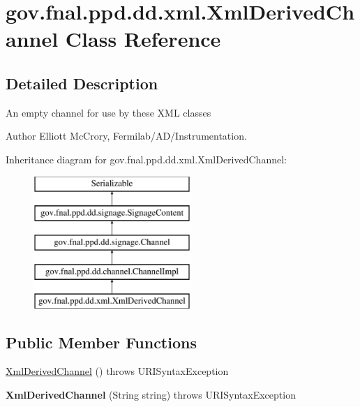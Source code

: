 \hypertarget{classgov_1_1fnal_1_1ppd_1_1dd_1_1xml_1_1XmlDerivedChannel}{\section{gov.\-fnal.\-ppd.\-dd.\-xml.\-Xml\-Derived\-Channel Class Reference}
\label{classgov_1_1fnal_1_1ppd_1_1dd_1_1xml_1_1XmlDerivedChannel}
}


\subsection{Detailed Description}
An empty channel for use by these X\-M\-L classes

\begin{DoxyAuthor}{Author}
Elliott Mc\-Crory, Fermilab/\-A\-D/\-Instrumentation. 
\end{DoxyAuthor}
Inheritance diagram for gov.\-fnal.\-ppd.\-dd.\-xml.\-Xml\-Derived\-Channel\-:\begin{figure}[H]
\begin{center}
\leavevmode
\includegraphics[height=5.000000cm]{classgov_1_1fnal_1_1ppd_1_1dd_1_1xml_1_1XmlDerivedChannel}
\end{center}
\end{figure}
\subsection*{Public Member Functions}
\begin{DoxyCompactItemize}
\item 
\hyperlink{classgov_1_1fnal_1_1ppd_1_1dd_1_1xml_1_1XmlDerivedChannel_a99604d4e33cb14128bdadbbeb26e961a}{Xml\-Derived\-Channel} ()  throws U\-R\-I\-Syntax\-Exception 
\item 
\hypertarget{classgov_1_1fnal_1_1ppd_1_1dd_1_1xml_1_1XmlDerivedChannel_a42743783587a2fcfe7ed1eebe5d04299}{{\bfseries Xml\-Derived\-Channel} (String string)  throws U\-R\-I\-Syntax\-Exception }\label{classgov_1_1fnal_1_1ppd_1_1dd_1_1xml_1_1XmlDerivedChannel_a42743783587a2fcfe7ed1eebe5d04299}

\end{DoxyCompactItemize}
